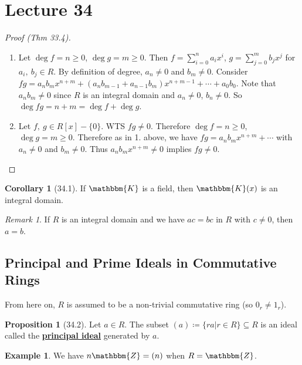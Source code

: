 \documentclass{article}
\newcommand{\Z}{\mathbbm{Z}}
\newcommand{\coleq}{\coloneqq}
\newcommand{\define}[1]{\textbf{\underline{#1}}}
\renewcommand{\Subset}{\subseteq}
\theoremstyle{definition}
\newtheorem*{cor}{Corollary}
\newtheorem*{prop}{Proposition}
\newtheorem*{ex}{Example}
\theoremstyle{remark}
\newtheorem*{rmk}{Remark}
\newcommand{\K}{\mathbbm{K}}
\begin{document}
    \section*{Lecture 34}{
        \begin{proof}[Proof (Thm 33.4)]
            \begin{enumerate}
                \item Let $\deg f=n\geq0$, $\deg g=m \geq 0$. Then $f=\sum_{i=0}^n a_ix^i$, $g=\sum_{j=0}^m b_jx^j$ for $a_i, \ b_j \in R$. By definition of degree, $a_n\neq 0$ and $b_m \neq 0$. Consider $fg=a_nb_mx^{n+m}+(a_nb_{m-1}+a_{n-1}b_m)x^{n+m-1}+\cdots+a_0b_0$. Note that $a_nb_m\neq 0$ since $R$ is an integral domain and $a_n\neq 0$, $b_n\neq 0$. So $\deg fg=n+m=\deg f+\deg g$.
                \item Let $f, \ g\in R[x]-\{0\}$. WTS $fg\neq 0$. Therefore $\deg f=n \geq 0$, $\deg g=m \geq 0$. Therefore as in 1. above, we have $fg=a_nb_mx^{n+m}+\cdots$ with $a_n \neq 0$ and $b_m \neq 0$. Thus $a_nb_mx^{n+m}\neq 0$ implies $fg\neq 0$.
            \end{enumerate}
        \end{proof}
        
        \begin{cor}[34.1]
            If $\K$ is a field, then $\K(x)$ is an integral domain.
        \end{cor}
        
        \begin{rmk}
            If $R$ is an integral domain and we have $ac=bc$ in $R$ with $c\neq 0$, then $a=b$.
        \end{rmk}
        
        \subsection*{Principal and Prime Ideals in Commutative Rings}{
            From here on, $R$ is assumed to be a non-trivial commutative ring (so $0_r\neq 1_r$).
            
            \begin{prop}[34.2]
                Let $a \in R$. The subset $(a)\coleq\{ra|r\in R\}\Subset R$ is an ideal called the \define{principal ideal} generated by $a$.
            \end{prop}
            
            \begin{ex}
                We have $n\Z=(n)$ when $R=\Z$.
            \end{ex}
            
}}
\end{document}
